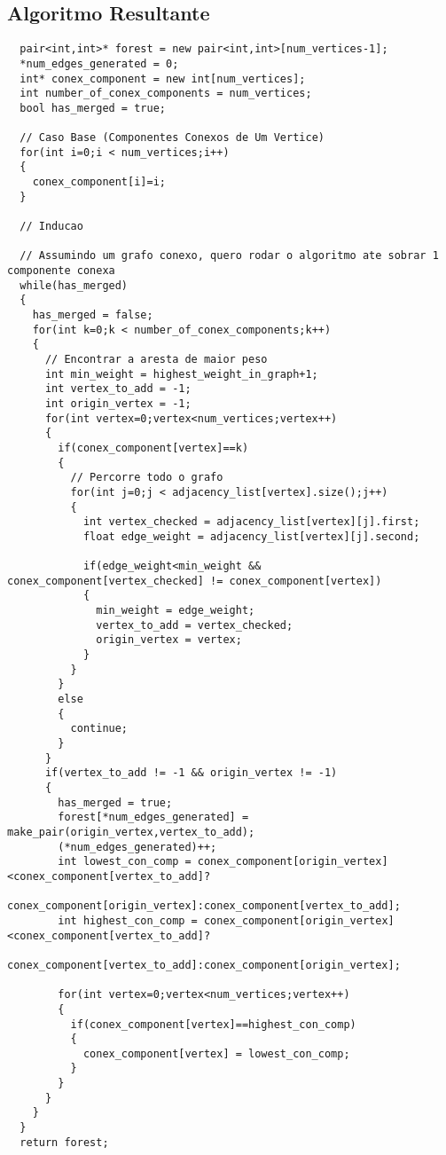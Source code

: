 \documentclass[12pt]{article}
\begin{document}
\subsection{ Algoritmo Resultante }
\begin{lstlisting}
  pair<int,int>* forest = new pair<int,int>[num_vertices-1];
  *num_edges_generated = 0;
  int* conex_component = new int[num_vertices];
  int number_of_conex_components = num_vertices;
  bool has_merged = true;

  // Caso Base (Componentes Conexos de Um Vertice)
  for(int i=0;i < num_vertices;i++)
  {
    conex_component[i]=i;
  }

  // Inducao

  // Assumindo um grafo conexo, quero rodar o algoritmo ate sobrar 1 componente conexa
  while(has_merged)
  {
    has_merged = false;
    for(int k=0;k < number_of_conex_components;k++)
    {
      // Encontrar a aresta de maior peso
      int min_weight = highest_weight_in_graph+1;
      int vertex_to_add = -1;
      int origin_vertex = -1;
      for(int vertex=0;vertex<num_vertices;vertex++)
      {
        if(conex_component[vertex]==k)
        {
          // Percorre todo o grafo
          for(int j=0;j < adjacency_list[vertex].size();j++)
          {
            int vertex_checked = adjacency_list[vertex][j].first;
            float edge_weight = adjacency_list[vertex][j].second;

            if(edge_weight<min_weight && conex_component[vertex_checked] != conex_component[vertex])
            {
              min_weight = edge_weight;
              vertex_to_add = vertex_checked;
              origin_vertex = vertex;
            }
          }
        }
        else
        {
          continue;
        }
      }
      if(vertex_to_add != -1 && origin_vertex != -1)
      {
        has_merged = true;
        forest[*num_edges_generated] = make_pair(origin_vertex,vertex_to_add);
        (*num_edges_generated)++;
        int lowest_con_comp = conex_component[origin_vertex]<conex_component[vertex_to_add]?
          conex_component[origin_vertex]:conex_component[vertex_to_add];
        int highest_con_comp = conex_component[origin_vertex]<conex_component[vertex_to_add]?
          conex_component[vertex_to_add]:conex_component[origin_vertex];

        for(int vertex=0;vertex<num_vertices;vertex++)
        {
          if(conex_component[vertex]==highest_con_comp)
          {
            conex_component[vertex] = lowest_con_comp;
          }
        }
      }
    }
  }
  return forest;
\end{lstlisting}
\end{document}
